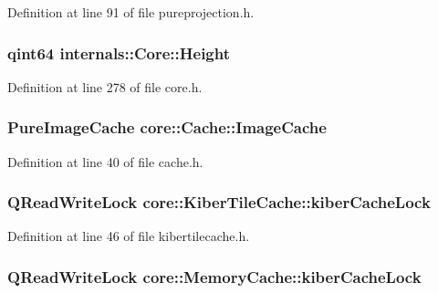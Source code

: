 Definition at line 91 of file pureprojection.\-h.

\hypertarget{group___o_p_map_widget_ga9a5a3c48699aba8ef9582514fca243f0}{
\subsubsection[{Height}]{\setlength{\rightskip}{0pt plus 5cm}qint64 internals\-::\-Core\-::\-Height\hspace{0.3cm}{\ttfamily [protected]}}}\label{group___o_p_map_widget_ga9a5a3c48699aba8ef9582514fca243f0}


Definition at line 278 of file core.\-h.

\hypertarget{group___o_p_map_widget_gab71cf242d304174673b1385ade1915bd}{
\subsubsection[{Image\-Cache}]{\setlength{\rightskip}{0pt plus 5cm}Pure\-Image\-Cache core\-::\-Cache\-::\-Image\-Cache}}\label{group___o_p_map_widget_gab71cf242d304174673b1385ade1915bd}


Definition at line 40 of file cache.\-h.

\hypertarget{group___o_p_map_widget_ga33731aa2cecd7ba1200e9871f3380308}{
\subsubsection[{kiber\-Cache\-Lock}]{\setlength{\rightskip}{0pt plus 5cm}Q\-Read\-Write\-Lock core\-::\-Kiber\-Tile\-Cache\-::kiber\-Cache\-Lock}}\label{group___o_p_map_widget_ga33731aa2cecd7ba1200e9871f3380308}


Definition at line 46 of file kibertilecache.\-h.

\hypertarget{group___o_p_map_widget_ga9c5f2537ff4510c8890590e73ea95b65}{
\subsubsection[{kiber\-Cache\-Lock}]{\setlength{\rightskip}{0pt plus 5cm}Q\-Read\-Write\-Lock core\-::\-Memory\-Cache\-::kiber\-Cache\-Lock}}\label{group___o_p_map_widget_ga9c5f2537ff4510c8890590e73ea95b65}


